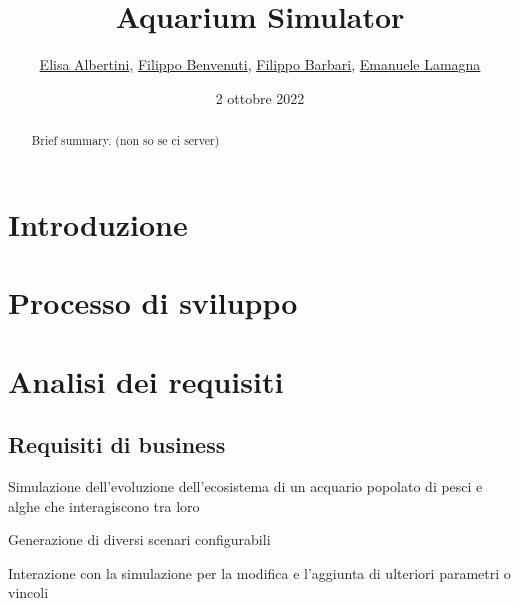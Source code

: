 \documentclass[12pt,a4paper,oneside,article]{article}
\title{Aquarium Simulator}
\author{
	\href{mailto:filippo.barbari@studio.unibo.it}{Elisa Albertini},
	\href{mailto:filippo.barbari@studio.unibo.it}{Filippo Benvenuti},
	\href{mailto:filippo.barbari@studio.unibo.it}{Filippo Barbari},
	\href{mailto:filippo.barbari@studio.unibo.it}{Emanuele Lamagna}
}
\date{2 ottobre 2022}
\begin{document}
	\maketitle
	
	\begin{abstract}
		Brief summary. (non so se ci server)
	\end{abstract}
	
	\tableofcontents
	\clearpage

    \section{Introduzione}
    
    \section{Processo di sviluppo}
    
    \section{Analisi dei requisiti}
    \subsection{Requisiti di business}
    \begin{legal}[label*=1.\arabic*.]
   		\item Simulazione dell'evoluzione dell'ecosistema di un acquario popolato di pesci e alghe che interagiscono tra loro
   		\begin{legal}
   			\item Generazione di diversi scenari configurabili
   			\item Interazione con la simulazione per la modifica e l’aggiunta di ulteriori parametri o vincoli
   		\end{legal}
    \end{legal}
\end{document}
